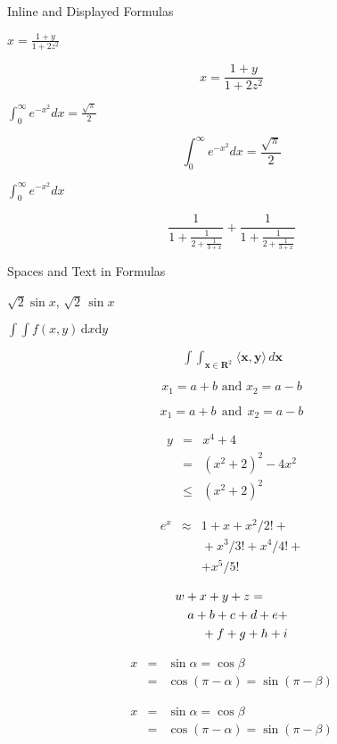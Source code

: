 \documentclass{article}
\begin{document}
Inline and Displayed Formulas

$x=\frac{1+y}{1+2z^2}$

$$x=\frac{1+y}{1+2z^2}$$

$\int_0^\infty e^{-x^2} dx=\frac{\sqrt{\pi}}{2}$

$$\int_0^\infty e^{-x^2} dx=\frac{\sqrt{\pi}}{2}$$

$\displaystyle \int_0^\infty e^{-x^2} dx$

$$
 \frac{1}{\displaystyle 1+
   \frac{1}{\displaystyle 2+
   \frac{1}{\displaystyle 3+x}}} +
 \frac{1}{1+\frac{1}{2+\frac{1}{3+x}}}
$$

Spaces and Text in Formulas

$\sqrt{2} \sin x$, $\sqrt{2}\,\sin x$

$\int \!\! \int f(x,y)\,\mathrm{d}x\mathrm{d}y$

$$
 \mathop{\int \!\!\! \int}_{\mathbf{x} \in \mathbf{R}^2} 
 \! \langle \mathbf{x},\mathbf{y}\rangle 
 \,d\mathbf{x}
$$

$$ x_1 = a+b \mbox{ and } x_2=a-b $$

$$ x_1 = a+b ~~\mbox{and}~~ x_2=a-b $$

\begin{eqnarray}
 y &=& x^4 + 4      \nonumber \\
   &=& (x^2+2)^2 -4x^2 \nonumber \\
   &\le&(x^2+2)^2
\end{eqnarray}

\begin{eqnarray*}
 e^x &\approx& 1+x+x^2/2! + \\
   && {}+x^3/3! + x^4/4! + \\
   && + x^5/5!
\end{eqnarray*}

\begin{eqnarray*}
 \lefteqn{w+x+y+z = }\\
   && a+b+c+d+e+\\
   && {}+f+g+h+i
\end{eqnarray*}

\begin{eqnarray*}
 x&=&\sin \alpha = \cos \beta\\
  &=&\cos(\pi-\alpha) = \sin(\pi-\beta)
\end{eqnarray*}

{\setlength\arraycolsep{0.1em}
 \begin{eqnarray*}
  x&=&\sin \alpha = \cos \beta\\
   &=&\cos(\pi-\alpha) = \sin(\pi-\beta)
 \end{eqnarray*}
}
\end{document}
